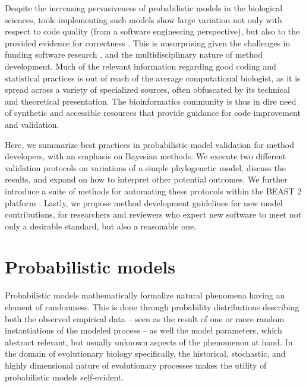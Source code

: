 \documentclass[oneside]{article}
\begin{document}
Despite the increasing pervasiveness of probabilistic models in the biological sciences, tools implementing such models show large variation not only with respect to code quality (from a software engineering perspective), but also to the provided evidence for correctness \citep{darriba18}.
This is unsurprising given the challenges in funding software research \citep{siepel19}, and the multidisciplinary nature of method development.
Much of the relevant information regarding good coding and statistical practices is out of reach of the average computational biologist, as it is spread across a variety of specialized sources, often obfuscated by its technical and theoretical presentation.
The bioinformatics community is thus in dire need of synthetic and accessible resources that provide guidance for code improvement and validation.

Here, we summarize best practices in probabilistic model validation for method developers, with an emphasis on Bayesian methods.
We execute two different validation protocols on variations of a simple phylogenetic model, discuss the results, and expand on how to interpret other potential outcomes.
We further introduce a suite of methods for automating these protocols within the BEAST 2 platform \citep{beast25}.
Lastly, we propose method development guidelines for new model contributions, for researchers and reviewers who expect new software to meet not only a desirable standard, but also a reasonable one.


\section*{Probabilistic models}
\label{sec:prob_models}

Probabilistic models mathematically formalize natural phenomena
having an element of randomness.
This is done through probability distributions describing both the observed
empirical data -- seen as the result of one or more random instantiations of the modeled process -- as well the model parameters, which abstract relevant, but usually unknown aspects of the phenomenon at hand.
In the domain of evolutionary biology specifically, the historical, stochastic, and highly dimensional nature of evolutionary processes makes the utility of probabilistic models self-evident. 
\end{document}
